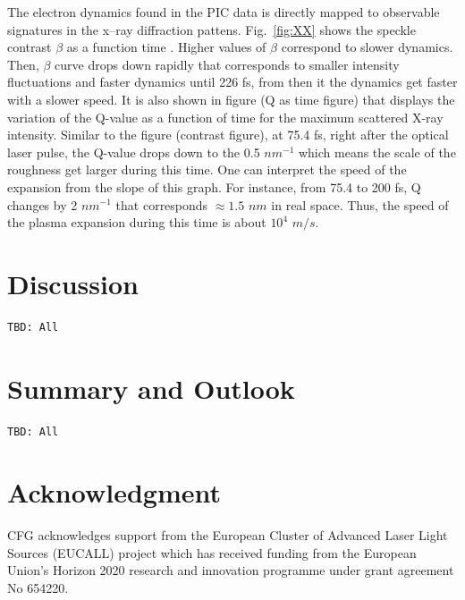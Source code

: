 \documentclass[preprint, 12pt]{elsarticle}
\begin{document}
{The electron dynamics found in the PIC data is directly mapped to observable
signatures in the x--ray diffraction pattens. Fig.~\ref{fig:XX}
shows the speckle contrast $\beta$ as a function time .
Higher values of $\beta$ correspond to slower dynamics.
Then, $\beta$ curve drops down rapidly that corresponds to
smaller intensity fluctuations and faster dynamics until 226 fs, from then it
the dynamics get faster with a slower speed. It is also shown in figure (Q as
time figure) that displays the variation of the Q-value as a function of time
for the maximum scattered X-ray intensity. Similar to the figure (contrast
figure), at 75.4 fs, right after the optical laser pulse, the Q-value drops down
to the 0.5 $nm^{-1}$ which means the scale of the roughness get larger during
this time. One can interpret the speed of the expansion from the slope of this
graph. For instance, from 75.4 to 200 fs, Q changes by 2 $nm^{-1}$ that
corresponds $\approx 1.5$ $nm$ in real space. Thus, the speed of the plasma
expansion during this time is about $10^{4}$ $m/s$.
}
%
\section{Discussion\label{sec:Discussion}}
\begin{verbatim}
TBD: All
\end{verbatim}
%
\lipsum[3]
\section{Summary and Outlook\label{sec:summary}}
\begin{verbatim}
TBD: All
\end{verbatim}
%
\lipsum[4]
\section*{Acknowledgment}
CFG acknowledges support from the European Cluster of Advanced Laser Light
Sources (EUCALL) project which has received funding from the European Union’s
Horizon 2020 research and innovation programme under grant agreement No 654220.





%
\end{document}

